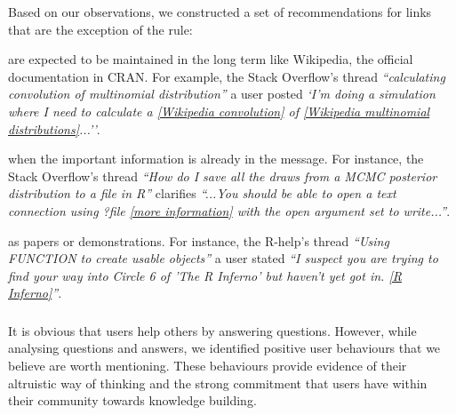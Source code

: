     Based on our observations, we constructed a set of recommendations for links that are the exception of the rule:

    \begin{description}[itemsep=3pt, topsep=2pt, leftmargin=3em, parsep=0pt]
        \item[Well known websites] are expected to be maintained in the long term like Wikipedia, the official documentation in CRAN.
        For example, the Stack Overflow's thread \textit{``calculating convolution of multinomial distribution''} a user posted \textit{`I'm doing a simulation where I need to calculate a \href{https://en.wikipedia.org/wiki/Convolution_of_probability_distributions}{[Wikipedia convolution]} of \href{https://en.wikipedia.org/wiki/Multinomial_distribution}{[Wikipedia multinomial distributions]}...''}.

        \item[Resources that support or expand the message] when the important information is already in the message.
        For instance, the Stack Overflow's thread \textit{``How do I save all the draws from a MCMC posterior distribution to a file in R''} clarifies \textit{``...You should be able to open a text connection using ?file \href{http://stat.ethz.ch/R-manual/R-devel/library/base/html/connections.html}{[more information]} with the open argument set to write...''}.

        \item[Material relevant to the message is too big] as papers or demonstrations.
        For instance, the R-help's thread \textit{``Using FUNCTION to create usable objects''} a user stated \textit{``I suspect you are trying to find your way into Circle 6 of 'The R Inferno' but haven't yet got in. \href{http://www.burns-stat.com/pages/Tutor/R\_inferno.pdf}{[R Inferno]}''}.
    \end{description}

\subsubsection{\rece}
\label{sec:userbeh}

It is obvious that users help others by answering questions. However, while analysing questions and answers, we identified positive user behaviours that
we believe are worth mentioning.  These behaviours provide evidence of their altruistic way of thinking and the strong commitment that users have within their
community towards knowledge building.

